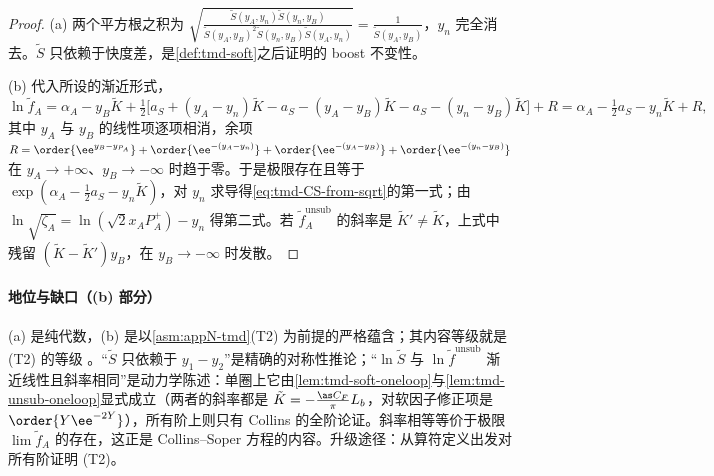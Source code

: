 \begin{proof}
(a) 两个平方根之积为 $\sqrt{\frac{\tilde S(y_A,y_n)\tilde S(y_n,y_B)}{\tilde S(y_A,y_B)^2\tilde S(y_n,y_B)\tilde S(y_A,y_n)}}=\frac1{\tilde S(y_A,y_B)}$，$y_n$ 完全消去。$\tilde S$ 只依赖于快度差，是\cref{def:tmd-soft}之后证明的 boost 不变性。

(b) 代入所设的渐近形式，
\[
\ln\tilde f_A=\alpha_A-y_B\tilde K+\tfrac12\big[a_S+(y_A-y_n)\tilde K-a_S-(y_A-y_B)\tilde K-a_S-(y_n-y_B)\tilde K\big]+R=\alpha_A-\tfrac12a_S-y_n\tilde K+R,
\]
其中 $y_A$ 与 $y_B$ 的线性项逐项相消，余项 $R=\order{\ee^{y_B-y_{P_A}}}+\order{\ee^{-(y_A-y_n)}}+\order{\ee^{-(y_A-y_B)}}+\order{\ee^{-(y_n-y_B)}}$ 在 $y_A\to+\infty$、$y_B\to-\infty$ 时趋于零。于是极限存在且等于 $\exp(\alpha_A-\frac12a_S-y_n\tilde K)$，对 $y_n$ 求导得\cref{eq:tmd-CS-from-sqrt}的第一式；由 $\ln\sqrt{\zeta_A}=\ln(\sqrt2x_AP_A^+)-y_n$ 得第二式。若 $\tilde f_A^{\mathrm{unsub}}$ 的斜率是 $\tilde K'\neq\tilde K$，上式中残留 $(\tilde K-\tilde K')y_B$，在 $y_B\to-\infty$ 时发散。%
\end{proof}

\paragraph{地位与缺口（(b) 部分）}(a) 是纯代数，(b) 是以\cref{asm:appN-tmd}(T2) 为前提的严格蕴含；其内容等级就是 (T2) 的等级 \tagA。“$\tilde S$ 只依赖于 $y_1-y_2$”是精确的对称性推论；“$\ln\tilde S$ 与 $\ln\tilde f^{\mathrm{unsub}}$ 渐近线性且斜率相同”是动力学陈述：单圈上它由\cref{lem:tmd-soft-oneloop}与\cref{lem:tmd-unsub-oneloop}显式成立（两者的斜率都是 $\tilde K=-\frac{\as C_F}\pi L_b$，对软因子修正项是 $\order{Y\ee^{-2Y}}$），所有阶上则只有 Collins 的全阶论证\cite[第~10.11、13.8~节]{Collins2011}。斜率相等等价于极限 $\lim\tilde f_A$ 的存在，这正是 Collins--Soper 方程的内容。升级途径：从算符定义出发对所有阶证明 (T2)。

